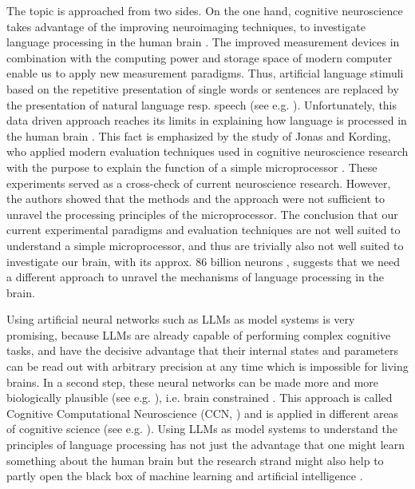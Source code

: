 The topic is approached from two sides. On the one hand, cognitive neuroscience takes advantage of the improving neuroimaging techniques, to investigate language processing in the human brain \cite{de2017research}. The improved measurement devices in combination with the computing power and storage space of modern computer enable us to apply new measurement paradigms. Thus, artificial language stimuli based on the repetitive presentation of single words or sentences \cite{de2017research} are replaced by the presentation of natural language resp. speech (see e.g. \cite{schilling2021analysis, schuller2023attentional, schuller2024early, koelbl2023adaptive, garibyan2022neural}). Unfortunately, this data driven approach reaches its limits in explaining how language is processed in the human brain \cite{schilling2023predictive}. This fact is emphasized by the study of Jonas and Kording, who applied modern evaluation techniques used in cognitive neuroscience research with the purpose to explain the function of a simple microprocessor \cite{jonas2017could}. These experiments served as a cross-check of current neuroscience research. However, the authors showed that the methods and the approach were not sufficient to unravel the processing principles of the microprocessor. The conclusion that our current experimental paradigms and evaluation techniques are not well suited to understand a simple microprocessor, and thus are trivially also not well suited to investigate our brain, with its approx. 86 billion neurons \cite{herculano2009human, gerum2020sparsity}, suggests that we need a different approach to unravel the mechanisms of language processing in the brain.

Using artificial neural networks such as LLMs as model systems is very promising, because LLMs are already capable of performing complex cognitive tasks, and have the decisive advantage that their internal states and parameters can be read out with arbitrary precision at any time which is impossible for living brains. In a second step, these neural networks can be made more and more biologically plausible (see e.g. \cite{gerum2021integration, gerum2020sparsity, gerum2023leaky, stoll2023coincidence}), i.e. brain constrained \cite{pulvermuller2021biological}.
This approach is called Cognitive Computational Neuroscience (CCN, \cite{kriegeskorte2018cognitive}) and is applied in different areas of cognitive science (see e.g. \cite{stoewer2022neural, stoewer2023neural, stoewer2023multi,surendra2023word,schilling2023predictive}). Using LLMs as model systems to understand the principles of language processing has not just the advantage that one might learn something about the human brain but the research strand might also help to partly open the black box of machine learning and artificial intelligence \cite{castelvecchi2016can}.

